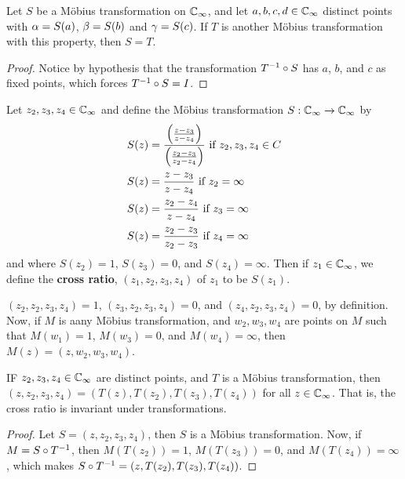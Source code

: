 \begin{lemma}\label{3.3.4}
    Let $S$ be a M\"obius transformation on  $\mathbb{C}_\infty$, and let  $a,b,c,d \in
    \mathbb{C}_\infty$ distinct points with  $\alpha=S(a)$, $\beta=S(b)$ and $\gamma=S(c)$. If $T$
    is another M\"obius transformation with this property, then  $S=T$.
\end{lemma}
\begin{proof}
    Notice by hypothesis that the transformation $T^{-1} \circ S$ has $a$,
    $b$, and  $c$ as fixed points, which forces  $T^{-1} \circ S=I$.
\end{proof}

\begin{definition}
    Let $z_2,z_3,z_4 \in \mathbb{C}_\infty$ and define the M\"obius transformation
    $S:\mathbb{C}_\infty \xrightarrow{} \mathbb{C}_\infty$ by
    \begin{align*}
        S(z)    &=  \frac{\Big{(} \frac{z-z_3}{z-z_4} \Big{)}}{\Big{(}
                        \frac{z_2-z_3}{z_2-z_4} \Big{)}} \text{ if } z_2,z_3,z_4
                                \in C   \\
        S(z)    &= \frac{z-z_3}{z-z_4} \text{ if } z_2=\infty   \\
        S(z)    &= \frac{z_2-z_4}{z-z_4} \text{ if } z_3=\infty   \\
        S(z)    &= \frac{z_2-z_3}{z_2-z_3} \text{ if } z_4=\infty   \\
    \end{align*}
    and where $S(z_2)=1$, $S(z_3)=0$, and $S(z_4)=\infty$. Then if $z_1 \in
    \mathbb{C}_\infty$, we define the \textbf{cross ratio}, $(z_1,z_2,z_3,z_4)$ of $z_1$
    to be $S(z_1)$.
\end{definition}

\begin{example}\label{example_3.8}
    $(z_2,z_2,z_3,z_4)=1$, $(z_3,z_2,z_3,z_4)=0$, and $(z_4,z_2,z_3,z_4)=0$, by
    definition. Now, if $M$ is aany M\"obius transformation, and  $w_2,w_3,w_4$
    are points on $M$ such that $M(w_1)=1$, $M(w_3)=0$, and $M(w_4)=\infty$,
    then $M(z)=(z,w_2,w_3,w_4)$.
\end{example}

\begin{theorem}\label{3.3.5}
    IF $z_2,z_3,z_4 \in \mathbb{C}_\infty$ are distinct points, and $T$ is a M\"obius
    transformation, then  $(z,z_2,z_3,z_4)=(T(z),T(z_2),T(z_3),T(z_4))$ for all
    $z \in \mathbb{C}_\infty$. That is, the cross ratio is invariant under
    transformations.
\end{theorem}
\begin{proof}
    Let $S=(z,z_2,z_3,z_4)$, then $S$ is a M\"obius transformation. Now, if
    $M=S \circ T^{-1}$, then $M(T(z_2))=1$, $M(T(z_3))=0$, and
    $M(T(z_4))=\infty$, which makes $S \circ T^{-1}=(z,T(z_2),T(z_3),T(z_4))$.
\end{proof}

